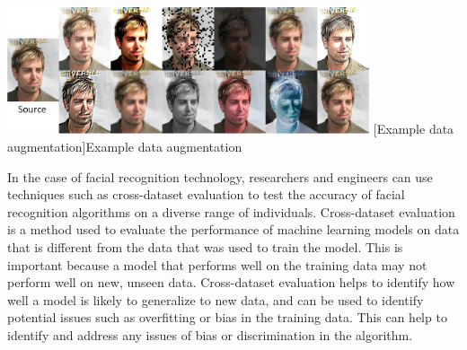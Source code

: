 \documentclass[
	12pt,
    a4paper,
    egregdoesnotlikesansseriftitles, %
    toc=chapterentrywithdots,
    oneside, openany,
    titlepage,
    parskip=half,
    headings=normal,  %
    listof=totoc,
    bibliography=totocnumbered,
    index=totoc,
    captions=tableheading,  %
    listof=flat,
    numbers=noenddot, %
    final]
    {scrbook}
\begin{document}
\vspace{1em}
\begin{minipage}{\linewidth}
	\centering
	\includegraphics[width=0.8\textwidth]{figures/augmentation2.jpg}
	[Example data augmentation]{Example data augmentation \cite{singh_face_2020}}
	\label{fig:augmentation}
\end{minipage}



In the case of facial recognition technology, researchers and engineers can use techniques such as cross-dataset evaluation to test the accuracy of facial recognition algorithms on a diverse range of individuals. 
Cross-dataset evaluation is a method used to evaluate the performance of machine learning models on data that is different from the data that was used to train the model.
This is important because a model that performs well on the training data may not perform well on new, unseen data.
Cross-dataset evaluation helps to identify how well a model is likely to generalize to new data, and can be used to identify potential issues such as overfitting or bias in the training data.
This can help to identify and address any issues of bias or discrimination in the algorithm. \cite[p. 1-2]{yang_cross-datasets_2022} \cite[p. 3679-3680]{chen_cdevalsumm_2020}
\end{document}
